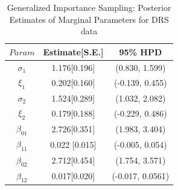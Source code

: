 \documentclass[11pt]{article}
\theoremstyle{remboldstyle}
\begin{document}
\begin{table}[H]
\caption{Generalized Importance Sampling: Posterior Estimates of Marginal Parameters for DRS data}
\centering
\begin{tabular}{c c c}
\hline
$Param$      & Estimate[S.E.] & 95\% HPD\\
\hline
$\sigma_1$      & 1.176[0.196]        & (0.830, 1.599)\\   
$\xi_1$      & 0.202[0.160]        & (-0.139, 0.455)\\
$\sigma_2$ & 1.524[0.289]              & (1.032, 2.082)\\
$\xi_2$      & 0.179[0.188]        & (-0.229, 0.486)\\   
$\beta_{01}$      & 2.726[0.351]        & (1.983, 3.404)\\
$\beta_{11}$ & 0.022 [0.015]             & (-0.005, 0.054)\\
$\beta_{02}$      & 2.712[0.454]        & (1.754, 3.571)\\   
$\beta_{12}$      & 0.017[0.020]        & (-0.017, 0.0561)\\
 \hline             
\end{tabular}
\label{tab5}
\end{table}
\end{document}
